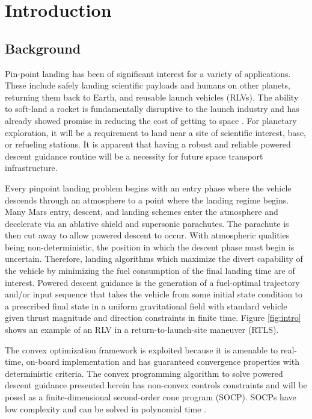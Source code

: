 \chapter{Introduction}
\label{introchap}

\section{Background}
Pin-point landing has been of significant interest for a variety of applications. These include safely landing scientific payloads and humans on other planets, returning them back to Earth, and reusable launch vehicles (RLVs). The ability to soft-land a rocket is fundamentally disruptive to the launch industry and has already showed promise in reducing the cost of getting to space \cite{jones2018recent}. For planetary exploration, it will be a requirement to land near a site of scientific interest, base, or refueling stations. It is apparent that having a robust and reliable powered descent guidance routine will be a necessity for future space transport infrastructure.

Every pinpoint landing problem begins with an entry phase where the vehicle descends through an atmosphere to a point where the landing regime begins. Many Mars entry, descent, and landing schemes enter the atmosphere and decelerate via an ablative shield and supersonic parachutes. The parachute is then cut away to allow powered descent to occur. With atmospheric qualities being non-deterministic, the position in which the descent phase must begin is uncertain. Therefore, landing algorithms which maximize the divert capability of the vehicle by minimizing the fuel consumption of the final landing time are of interest. Powered descent guidance is the generation of a fuel-optimal trajectory and/or input sequence that takes the vehicle from some initial state condition to a prescribed final state in a uniform gravitational field with standard vehicle given thrust magnitude and direction constraints in finite time. Figure \ref{fig:intro} shows an example of an RLV in a return-to-launch-site maneuver (RTLS).

The convex optimization framework is exploited because it is amenable to real-time, on-board implementation and has guaranteed convergence properties with deterministic criteria. The convex programming algorithm to solve powered descent guidance presented herein has non-convex controls constraints and will be posed as a finite-dimensional second-order cone program (SOCP). SOCPs have low complexity and can be solved in polynomial time \cite{boyd2004convex}.

